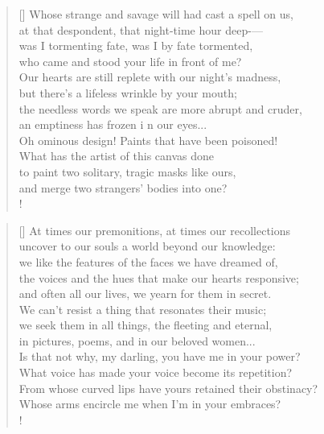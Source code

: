 \documentclass[]{article}
\begin{document}
\settowidth{\versewidth}{Whose strange and savage will had cast a spell on us}
\begin{verse}[\versewidth]
Whose strange and savage will had cast a spell on us,\\
at that despondent, that night-time hour deep-— \\
was I tormenting fate, was I by fate tormented,\\
who came and stood your life in front of me?\\
Our hearts are still replete with our night's madness,\\
but there's a lifeless wrinkle by your mouth;\\
the needless words we speak are more abrupt and cruder,\\
an emptiness has frozen i n our eyes...\\
Oh ominous design! Paints that have been poisoned!\\
What has the artist of this canvas done \\
to paint two solitary, tragic masks like ours,\\
and merge two strangers' bodies into one?\\!
\end{verse}
\bigskip \bigskip

\settowidth{\versewidth}{At times our premonitions, at times our recollections}
\begin{verse}[\versewidth]
At times our premonitions, at times our recollections\\
uncover to our souls a world beyond our knowledge:\\
we like the features of the faces we have dreamed of,\\
the voices and the hues that make our hearts responsive;\\
and often all our lives, we yearn for them in secret.\\
We can't resist a thing that resonates their music;\\
we seek them in all things, the fleeting and eternal,\\
in pictures, poems, and in our beloved women...\\
Is that not why, my darling, you have me in your power?\\
What voice has made your voice become its repetition?\\
From whose curved lips have yours retained their obstinacy?\\
Whose arms encircle me when I'm in your embraces? \\!
\end{verse}
\bigskip \bigskip
\end{document}
